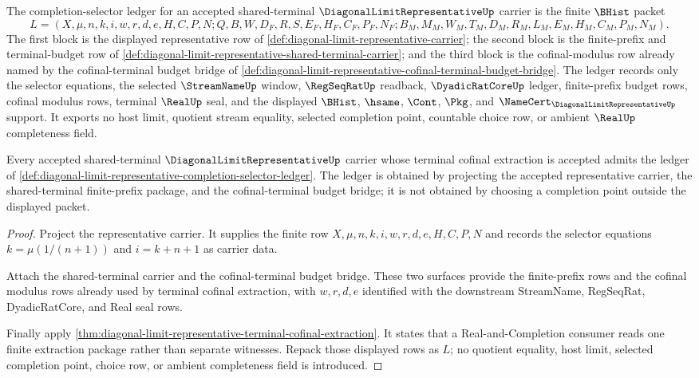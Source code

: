 \begin{definition}
\label{def:diagonal-limit-representative-completion-selector-ledger}
The completion-selector ledger for an accepted shared-terminal $\DiagonalLimitRepresentativeUp$ carrier is the finite $\BHist$ packet
$$
L=(X,\mu,n,k,i,w,r,d,e,H,C,P,N;Q,B,W,D_F,R,S,E_F,H_F,C_F,P_F,N_F;B_M,M_M,W_M,T_M,D_M,R_M,L_M,E_M,H_M,C_M,P_M,N_M).
$$
The first block is the displayed representative row of \autoref{def:diagonal-limit-representative-carrier}; the second block is the finite-prefix and terminal-budget row of \autoref{def:diagonal-limit-representative-shared-terminal-carrier}; and the third block is the cofinal-modulus row already named by the cofinal-terminal budget bridge of \autoref{def:diagonal-limit-representative-cofinal-terminal-budget-bridge}. The ledger records only the selector equations, the selected $\StreamNameUp$ window, $\RegSeqRatUp$ readback, $\DyadicRatCoreUp$ ledger, finite-prefix budget rows, cofinal modulus rows, terminal $\RealUp$ seal, and the displayed $\BHist$, $\hsame$, $\Cont$, $\Pkg$, and $\NameCert_{\DiagonalLimitRepresentativeUp}$ support. It exports no host limit, quotient stream equality, selected completion point, countable choice row, or ambient $\RealUp$ completeness field.
\end{definition}

\begin{theorem}
\label{thm:diagonal-limit-representative-completion-selector-existence}
Every accepted shared-terminal $\DiagonalLimitRepresentativeUp$ carrier whose terminal cofinal extraction is accepted admits the ledger of \autoref{def:diagonal-limit-representative-completion-selector-ledger}. The ledger is obtained by projecting the accepted representative carrier, the shared-terminal finite-prefix package, and the cofinal-terminal budget bridge; it is not obtained by choosing a completion point outside the displayed packet.
\end{theorem}
\begin{proof}
Project the representative carrier. It supplies the finite row $X,\mu,n,k,i,w,r,d,e,H,C,P,N$ and records the selector equations $k=\mu(1/(n+1))$ and $i=k+n+1$ as carrier data.

Attach the shared-terminal carrier and the cofinal-terminal budget bridge. These two surfaces provide the finite-prefix rows and the cofinal modulus rows already used by terminal cofinal extraction, with $w,r,d,e$ identified with the downstream StreamName, RegSeqRat, DyadicRatCore, and Real seal rows.

Finally apply \autoref{thm:diagonal-limit-representative-terminal-cofinal-extraction}. It states that a Real-and-Completion consumer reads one finite extraction package rather than separate witnesses. Repack those displayed rows as $L$; no quotient equality, host limit, selected completion point, choice row, or ambient completeness field is introduced.
\end{proof}

